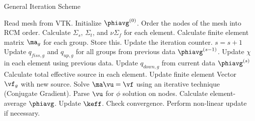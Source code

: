 \begin{frame}

    \begin{algorithm}[H]
      \caption{\scriptsize General Iteration Scheme}
      \label{algorithm:general}
      \begin{algorithmic}[1]
      \State Read mesh from VTK.
      \State Initialize $\phiavg^{(0)}$.
      \State Order the nodes of the mesh into RCM order.
        \label{state:rcm}
      \State Calculate $\Sigma_s$, $\Sigma_t$, and $\nu \Sigma_f$ for each 
        element.
      \State Calculate finite element matrix $\ma_g$ for each group. Store this. 
        \label{state:fem_matrix}
        \State Update the iteration counter. $s=s+1$
        \State Update $q_{fiss,g}$ and $q_{up,g}$ for all groups from previous 
          data $\phiavg^{(s-1)}$.
        \State Update $\chi$ in each element using previous data.
          \label{state:chi_collapse}
          \State Update $q_{down,g}$ from current data $\phiavg^{(s)}$
          \State Calculate total effective source in each element.
          \State Update finite element Vector $\vf_g$ with new source.
            \label{state:fem_vector}
          \State Solve $\ma \vu = \vf$ using an iterative technique (Conjugate
            Gradient).
          \State Parse $\vu$ for $\phi$ solution on nodes.
          \State Calculate element-average $\phiavg$.
        \EndFor
        \State Update $\keff$.
        \State Check convergence.
        \State Perform non-linear update if necessary. \label{state:nonlinear}
      \EndWhile
      \end{algorithmic}
    \end{algorithm}

\end{frame}
